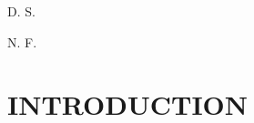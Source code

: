 \documentclass[11pt]{book}
\begin{document}
\hfill D. S.\hspace{1cm}

\hfill N. F.\hspace{1cm}

\part*{INTRODUCTION}









\end{document}
